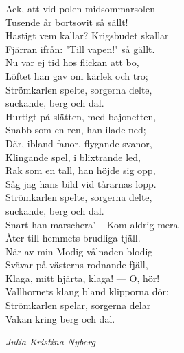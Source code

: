 \documentclass[a6paper,10pt]{article}
\newcommand{\notis}[1]{\begin{flushright}\textit{#1}\end{flushright}}
\begin{document}
\newpage
\setlength{\oddsidemargin}{-0.47in}
\noindent
Ack, att vid polen midsommarsolen\\
Tusende år bortsovit så sällt!\\
Hastigt vem kallar? Krigsbudet skallar\\
Fjärran ifrån: "Till vapen!" så gällt.\\
Nu var ej tid hos flickan att bo,\\
Löftet han gav om kärlek och tro;\\
Strömkarlen spelte, sorgerna delte,\\
suckande, berg och dal.
\vspace{5pt}\\
Hurtigt på slätten, med bajonetten,\\
Snabb som en ren, han ilade ned;\\
Där, ibland fanor, flygande svanor,\\
Klingande spel, i blixtrande led,\\
Rak som en tall, han höjde sig opp,\\
Såg jag hans bild vid tårarnas lopp.\\
Strömkarlen spelte, sorgerna delte,\\
suckande, berg och dal.
\vspace{5pt}\\
Snart han marschera' -- Kom aldrig mera\\
Åter till hemmets brudliga tjäll.\\
När av min Modig vålnaden blodig\\
Svävar på västerns rodnande fjäll,\\
Klaga, mitt hjärta, klaga! — O, hör!\\
Vallhornets klang bland klipporna dör:\\
Strömkarlen spelar, sorgerna delar\\
Vakan kring berg och dal.
\notis{Julia Kristina Nyberg}
\end{document}

